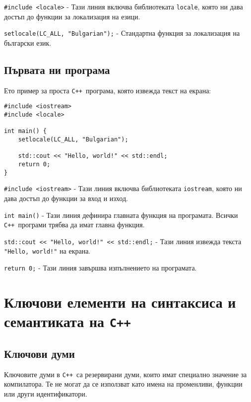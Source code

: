 \documentclass[oneside]{book}
\newcommand*{\code}[1]{\texttt{#1}}
\newcommand*{\cpp}{\texttt{C++}\ }
\begin{document}
\code{\#include <locale>} - Тази линия включва библиотеката \code{locale}, която ни дава достъп до функции за локализация на езици.

\code{setlocale(LC\_ALL, "Bulgarian");} - Стандартна функция за локализация на български език.

\subsection{Първата ни програма}
Ето пример за проста \cpp програма, която извежда текст на екрана:
\begin{mdframed}\begin{lstlisting}
#include <iostream>
#include <locale>

int main() {
    setlocale(LC_ALL, "Bulgarian");

    std::cout << "Hello, world!" << std::endl;
    return 0;
}
\end{lstlisting}\end{mdframed}

\code{\#include <iostream>} - Тази линия включва библиотеката \code{iostream}, която ни дава достъп до функции за вход и изход.

\code{int main()} - Тази линия дефинира главната функция на програмата. Всички \cpp програми трябва да имат главна функция.

\code{std::cout <}\code{< "Hello, world!"}\code{ <}\code{< std::endl;} - Тази линия извежда текста\\\code{"Hello, world!"} на екрана.

\code{return 0;} - Тази линия завършва изпълнението на програмата.

\section{Ключови елементи на синтаксиса и семантиката на \cpp}
\subsection{Ключови думи}
Ключовите думи в \cpp са резервирани думи, които имат специално значение за компилатора. Те не могат да се използват като имена на променливи, функции или други идентификатори.
\end{document}
